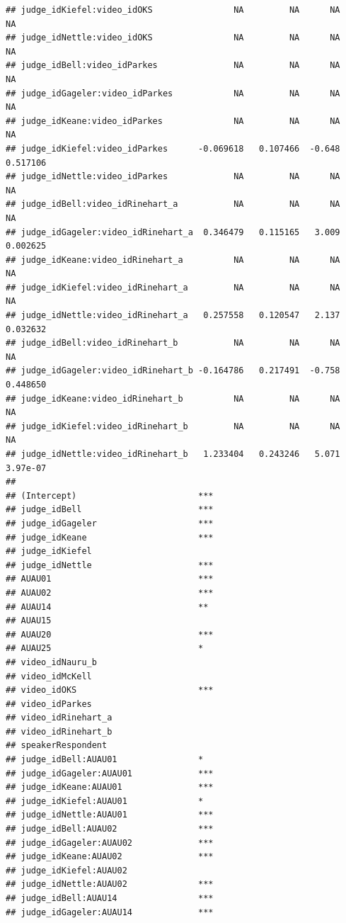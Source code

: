 \documentclass{monashthesis}
\begin{document}
\begin{verbatim}
## judge_idKiefel:video_idOKS                NA         NA      NA       NA
## judge_idNettle:video_idOKS                NA         NA      NA       NA
## judge_idBell:video_idParkes               NA         NA      NA       NA
## judge_idGageler:video_idParkes            NA         NA      NA       NA
## judge_idKeane:video_idParkes              NA         NA      NA       NA
## judge_idKiefel:video_idParkes      -0.069618   0.107466  -0.648 0.517106
## judge_idNettle:video_idParkes             NA         NA      NA       NA
## judge_idBell:video_idRinehart_a           NA         NA      NA       NA
## judge_idGageler:video_idRinehart_a  0.346479   0.115165   3.009 0.002625
## judge_idKeane:video_idRinehart_a          NA         NA      NA       NA
## judge_idKiefel:video_idRinehart_a         NA         NA      NA       NA
## judge_idNettle:video_idRinehart_a   0.257558   0.120547   2.137 0.032632
## judge_idBell:video_idRinehart_b           NA         NA      NA       NA
## judge_idGageler:video_idRinehart_b -0.164786   0.217491  -0.758 0.448650
## judge_idKeane:video_idRinehart_b          NA         NA      NA       NA
## judge_idKiefel:video_idRinehart_b         NA         NA      NA       NA
## judge_idNettle:video_idRinehart_b   1.233404   0.243246   5.071 3.97e-07
##                                       
## (Intercept)                        ***
## judge_idBell                       ***
## judge_idGageler                    ***
## judge_idKeane                      ***
## judge_idKiefel                        
## judge_idNettle                     ***
## AUAU01                             ***
## AUAU02                             ***
## AUAU14                             ** 
## AUAU15                                
## AUAU20                             ***
## AUAU25                             *  
## video_idNauru_b                       
## video_idMcKell                        
## video_idOKS                        ***
## video_idParkes                        
## video_idRinehart_a                    
## video_idRinehart_b                    
## speakerRespondent                     
## judge_idBell:AUAU01                *  
## judge_idGageler:AUAU01             ***
## judge_idKeane:AUAU01               ***
## judge_idKiefel:AUAU01              *  
## judge_idNettle:AUAU01              ***
## judge_idBell:AUAU02                ***
## judge_idGageler:AUAU02             ***
## judge_idKeane:AUAU02               ***
## judge_idKiefel:AUAU02                 
## judge_idNettle:AUAU02              ***
## judge_idBell:AUAU14                ***
## judge_idGageler:AUAU14             ***

\end{verbatim}
\end{document}

